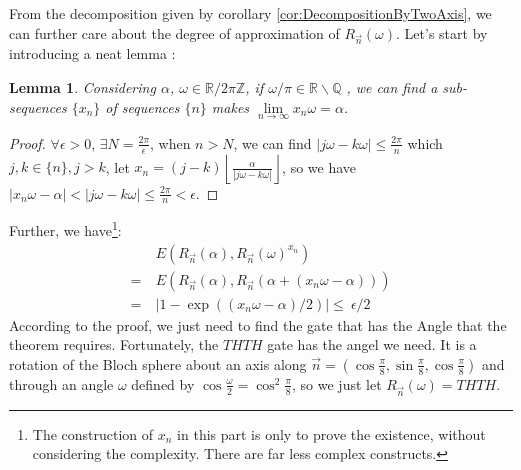 \documentclass[a4paper,10pt]{book}
\newtheorem{lemma}{Lemma}[section]
\numberwithin{equation}{section}
\begin{document}
From the decomposition given by corollary \ref{cor:DecompositionByTwoAxis}, we can further care about the degree of approximation of $R_{\vec{n}}(\omega)$. Let's start by introducing a neat lemma :
\begin{lemma}\label{AngleCoverR}
    Considering $\alpha$, $\omega \in \mathbb{R} /2\pi\mathbb{Z}$, if $\omega/\pi \in \mathbb{R} \backslash \mathbb{Q}$ , we can find a sub-sequences $\{x_n\}$ of sequences $\{n\}$ makes $\lim\limits_{n\to\infty}x_n\omega = \alpha$.
\end{lemma}
\begin{proof}
    $\forall \epsilon>0$, $\exists N=\frac{2\pi}{\epsilon}$, when $n>N$, we can find $|j\omega-k\omega|\leq\frac{2\pi}{n}$ which $j,k \in \{n\},j>k$, let $x_{n} = (j-k)\left\lfloor\frac{\alpha}{|j\omega-k\omega|}\right\rfloor$, so we have $|x_{n}\omega-\alpha|<|j\omega-k\omega|\leq\frac{2\pi}{n}<\epsilon$.
\end{proof}
Further, we have\footnote{The construction of $x_{n}$ in this part is only to prove the existence, without considering the complexity. There are far less complex constructs.}:
\begin{equation}
    \begin{split}
          & \ E(R_{\vec{n}}(\alpha),R_{\vec{n}}(\omega)^{x_{n}})              \\
        = & \ E(R_{\vec{n}}(\alpha),R_{\vec{n}}(\alpha+(x_{n}\omega-\alpha))) \\
        = & \ |1-\exp((x_{n}\omega-\alpha)/2)|\leq\ \epsilon/2
    \end{split}
\end{equation}
According to the proof, we just need to find the gate that has the Angle that the theorem requires. Fortunately, the $THTH$ gate has the angel we need. It is a rotation of the Bloch sphere about an axis along $\vec{n} = (\cos\frac{\pi}{8},\sin\frac{\pi}{8},\cos\frac{\pi}{8})$ and through an angle $\omega$ defined by $\cos\frac{\omega}{2} = \cos^{2}\frac{\pi}{8}$, so we just let $R_{\vec{n}}(\omega) = THTH$.
\end{document}

